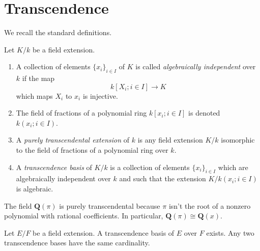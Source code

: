 \section{Transcendence}
\label{section-transcendence}

\noindent
We recall the standard definitions.

\begin{definition}
\label{definition-transcendence}
Let $K/k$ be a field extension.
\begin{enumerate}
\item A collection of elements $\{x_i\}_{i \in I}$ of $K$ is called
{\it algebraically independent} over $k$ if the map
$$
k[X_i; i\in I] \longrightarrow K
$$
which maps $X_i$ to $x_i$ is injective.
\item The field of fractions of a polynomial ring
$k[x_i; i \in I]$ is denoted $k(x_i; i\in I)$.
\item A {\it purely transcendental extension} of $k$ is any
field extension $K/k$ isomorphic to the field of
fractions of a polynomial ring over $k$.
\item A {\it transcendence basis} of $K/k$ is a
collection of elements $\{x_i\}_{i \in I}$ which are
algebraically independent over $k$ and such that
the extension $K/k(x_i; i\in I)$ is algebraic.
\end{enumerate}
\end{definition}

\begin{example}
\label{example-pi-transcendental}
The field $\mathbf{Q}(\pi)$ is purely transcendental because
$\pi$ isn't the root of a nonzero polynomial with rational coefficients.
In particular, $\mathbf{Q}(\pi) \cong \mathbf{Q}(x)$.
\end{example}

\begin{lemma}
\label{lemma-transcendence-degree}
Let $E/F$ be a field extension. A transcendence basis of $E$ over $F$ exists.
Any two transcendence bases have the same cardinality.
\end{lemma}


